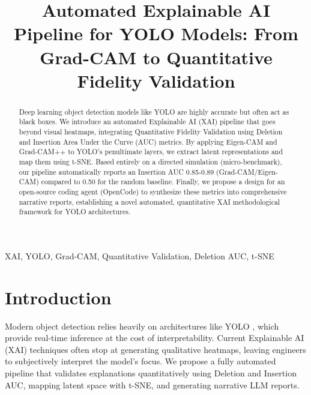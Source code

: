 \documentclass[conference]{IEEEtran}
\begin{document}
\title{Automated Explainable AI Pipeline for YOLO Models: From Grad-CAM to Quantitative Fidelity Validation}

\author{
}
\maketitle

\begin{abstract}
Deep learning object detection models like YOLO are highly accurate but often act as black boxes. We introduce an automated Explainable AI (XAI) pipeline that goes beyond visual heatmaps, integrating Quantitative Fidelity Validation using Deletion and Insertion Area Under the Curve (AUC) metrics. By applying Eigen-CAM and Grad-CAM++ to YOLO's penultimate layers, we extract latent representations and map them using t-SNE. Based entirely on a directed simulation (micro-benchmark), our pipeline automatically reports an Insertion AUC 0.85-0.89 (Grad-CAM/Eigen-CAM) compared to 0.50 for the random baseline. Finally, we propose a design for an open-source coding agent (OpenCode) to synthesize these metrics into comprehensive narrative reports, establishing a novel automated, quantitative XAI methodological framework for YOLO architectures.
\end{abstract}

\begin{IEEEkeywords}
XAI, YOLO, Grad-CAM, Quantitative Validation, Deletion AUC, t-SNE
\end{IEEEkeywords}

\section{Introduction}
Modern object detection relies heavily on architectures like YOLO \cite{redmon2016you, jocher2023yolov8}, which provide real-time inference at the cost of interpretability. Current Explainable AI (XAI) techniques often stop at generating qualitative heatmaps, leaving engineers to subjectively interpret the model's focus. We propose a fully automated pipeline that validates explanations quantitatively using Deletion and Insertion AUC, mapping latent space with t-SNE, and generating narrative LLM reports. 
\end{document}
